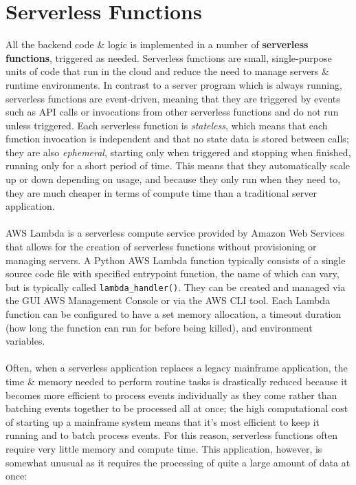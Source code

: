 \documentclass[a4paper,11pt]{report}
\begin{document}
\section{Serverless Functions}
All the backend code \& logic is implemented in a number of \textbf{serverless functions}\supercite{hassan2021survey}, triggered as needed.
Serverless functions are small, single-purpose units of code that run in the cloud and reduce the need to manage servers \& runtime environments.
In contrast to a server program which is always running, serverless functions are event-driven, meaning that they are triggered by events such as API calls or invocations from other serverless functions and do not run unless triggered.
Each serverless function is \textit{stateless}, which means that each function invocation is independent and that no state data is stored between calls;
they are also \textit{ephemeral}, starting only when triggered and stopping when finished, running only for a short period of time.
This means that they automatically scale up or down depending on usage, and because they only run when they need to, they are much cheaper in terms of compute time than a traditional server application.
\\\\
AWS Lambda\supercite{awslambda} is a serverless compute service provided by Amazon Web Services that allows for the creation of serverless functions without provisioning or managing servers.
A Python AWS Lambda function typically consists of a single source code file with specified entrypoint function, the name of which can vary, but is typically called \verb|lambda_handler()|.
They can be created and managed via the GUI AWS Management Console\supercite{aws_management_console} or via the AWS CLI tool\supercite{aws_cli}.
Each Lambda function can be configured to have a set memory allocation, a timeout duration (how long the function can run for before being killed), and environment variables.
\\\\
Often, when a serverless application replaces a legacy mainframe application, the time \& memory needed to perform routine tasks is drastically reduced because it becomes more efficient to process events individually as they come rather than batching events together to be processed all at once;
the high computational cost of starting up a mainframe system means that it's most efficient to keep it running and to batch process events.
For this reason, serverless functions often require very little memory and compute time.
This application, however, is somewhat unusual as it requires the processing of quite a large amount of data at once:
\end{document}

